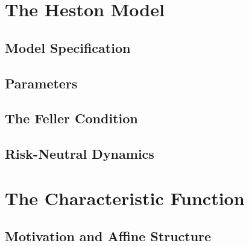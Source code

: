 \documentclass[11pt, a4paper]{article}
\numberwithin{equation}{subsection}
\numberwithin{definition}{subsection}
\numberwithin{theorem}{subsection}
\numberwithin{remark}{subsection}
\begin{document}
\section{The Heston Model}

\subsection{Model Specification}

\subsection{Parameters}

\subsection{The Feller Condition}

\subsection{Risk-Neutral Dynamics}


\section{The Characteristic Function}

\subsection{Motivation and Affine Structure}
\end{document}
